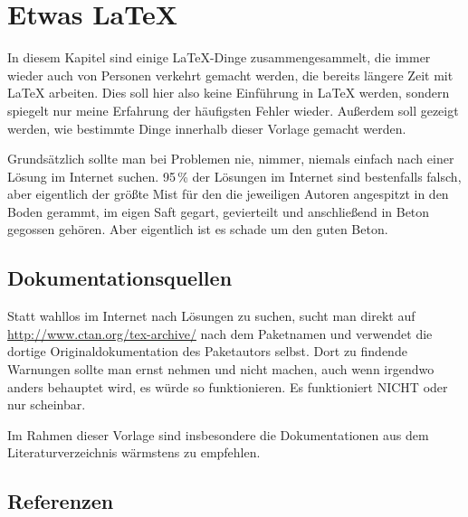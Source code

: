 \chapter{Etwas LaTeX}

In diesem Kapitel sind einige LaTeX-Dinge zusammengesammelt, die immer wieder
auch von Personen verkehrt gemacht werden, die bereits längere Zeit mit LaTeX
arbeiten. Dies soll hier also keine Einführung in LaTeX werden, sondern spiegelt
nur meine Erfahrung der häufigsten Fehler wieder. Außerdem soll gezeigt werden,
wie bestimmte Dinge innerhalb dieser Vorlage gemacht werden.

Grundsätzlich sollte man bei Problemen nie, nimmer, niemals einfach nach
einer Lösung im Internet suchen. 95\,\% der Lösungen im Internet sind
bestenfalls falsch, aber eigentlich der größte Mist für den die jeweiligen
Autoren angespitzt in den Boden gerammt, im eigen Saft gegart, gevierteilt und
anschließend in Beton gegossen gehören. Aber eigentlich ist es schade um den
guten Beton.

\section{Dokumentationsquellen}

Statt wahllos im Internet nach Lösungen zu suchen, sucht man direkt auf
\url{http://www.ctan.org/tex-archive/} nach dem Paketnamen und verwendet die
dortige Originaldokumentation des Paketautors selbst. Dort zu findende Warnungen
sollte man ernst nehmen und nicht machen, auch wenn irgendwo anders behauptet
wird, es würde so funktionieren. Es funktioniert NICHT oder nur scheinbar.

Im Rahmen dieser Vorlage sind insbesondere die Dokumentationen aus dem
Literaturverzeichnis wärmstens zu empfehlen.

\section{Referenzen}

